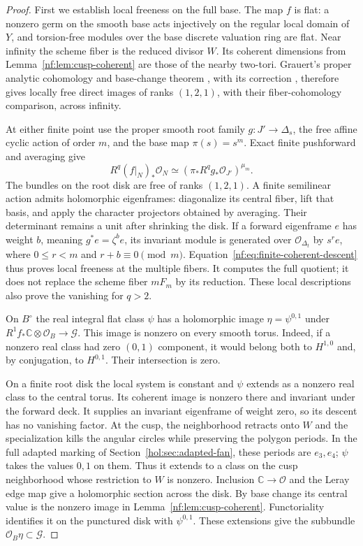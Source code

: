 \begin{proof}
First we establish local freeness on the full base. The map $f$
is flat: a nonzero germ on the smooth base acts injectively on
the regular local domain of $Y$, and torsion-free modules over
the base discrete valuation ring are flat.
Near infinity the scheme fiber is the reduced divisor $W$.
Its coherent dimensions from Lemma~\ref{nf:lem:cusp-coherent}
are those of the nearby two-tori. Grauert's proper analytic
cohomology and base-change theorem
\cite[\S7]{GrauertDirect}, with its correction
\cite{GrauertCorrection}, therefore gives
locally free direct images of ranks $(1,2,1)$, with their
fiber-cohomology comparison, across infinity.

At either finite point use the proper smooth root family
$g:J'\to\Delta_s$, the free affine cyclic action of order $m$,
and the base map $\pi(s)=s^m$. Exact finite pushforward and
averaging give
\begin{equation}\label{nf:eq:finite-coherent-descent}
 R^q(f|_N)_*\mathcal O_N
       \simeq\left(\pi_*R^qg_*\mathcal O_{J'}\right)^{\mu_m}.
\end{equation}
The bundles on the root disk are free of ranks $(1,2,1)$.
A finite semilinear action admits holomorphic eigenframes:
diagonalize its central fiber, lift that basis, and apply the
character projectors obtained by averaging. Their determinant
remains a unit after shrinking the disk. If a forward eigenframe
$e$ has weight $b$, meaning $g^*e=\zeta^b e$, its invariant
module is generated over $\mathcal O_{\Delta_t}$ by $s^re$,
where $0\le r<m$ and $r+b\equiv0\pmod m$.
Equation~\eqref{nf:eq:finite-coherent-descent} thus proves local
freeness at the multiple fibers. It computes the full quotient;
it does not replace the scheme fiber $mF_m$ by its reduction.
These local descriptions also prove the vanishing for $q>2$.

On $B^\circ$ the real integral flat class $\psi$ has a
holomorphic image
$\eta=\psi^{0,1}$ under
$R^1f_*\mathbb C\otimes\mathcal O_B\to\mathcal G$.
This image is nonzero on every smooth torus. Indeed, if a
nonzero real class had zero $(0,1)$ component, it would belong
both to $H^{1,0}$ and, by conjugation, to $H^{0,1}$.
Their intersection is zero.

On a finite root disk the local system is constant and $\psi$
extends as a nonzero real class to the central torus. Its
coherent image is nonzero there and invariant under the forward
deck. It supplies an invariant eigenframe of weight zero, so
its descent has no vanishing factor.
At the cusp, the neighborhood retracts onto $W$ and the
specialization kills the angular circles while preserving
the polygon periods. In the full adapted marking of
Section~\ref{hol:sec:adapted-fan}, these periods are $e_3,e_4$;
$\psi$ takes the values $0,1$ on them. Thus it extends to a
class on the cusp neighborhood whose restriction to $W$ is
nonzero. Inclusion $\mathbb C\to\mathcal O$ and the Leray
edge map give a holomorphic section across the disk.
By base change its central value is the nonzero image in
Lemma~\ref{nf:lem:cusp-coherent}. Functoriality identifies it
on the punctured disk with $\psi^{0,1}$. These extensions
give the subbundle $\mathcal O_B\eta\subset\mathcal G$.


\end{proof}
